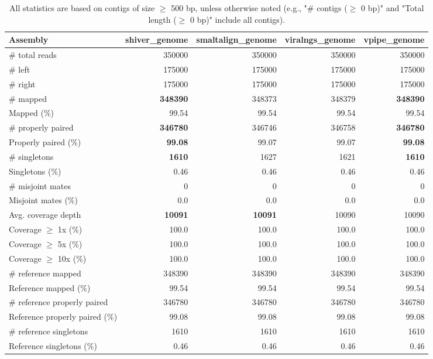 \documentclass[12pt,a4paper]{article}
\begin{document}
\begin{table}[ht]
\begin{center}
\caption{All statistics are based on contigs of size $\geq$ 500 bp, unless otherwise noted (e.g., "\# contigs ($\geq$ 0 bp)" and "Total length ($\geq$ 0 bp)" include all contigs).}
\begin{tabular}{|l*{4}{|r}|}
\hline
Assembly & shiver\_genome & smaltalign\_genome & viralngs\_genome & vpipe\_genome \\ \hline
\# total reads & 350000 & 350000 & 350000 & 350000 \\ \hline
\# left & 175000 & 175000 & 175000 & 175000 \\ \hline
\# right & 175000 & 175000 & 175000 & 175000 \\ \hline
\# mapped & {\bf 348390} & 348373 & 348379 & {\bf 348390} \\ \hline
Mapped (\%) & 99.54 & 99.54 & 99.54 & 99.54 \\ \hline
\# properly paired & {\bf 346780} & 346746 & 346758 & {\bf 346780} \\ \hline
Properly paired (\%) & {\bf 99.08} & 99.07 & 99.07 & {\bf 99.08} \\ \hline
\# singletons & {\bf 1610} & 1627 & 1621 & {\bf 1610} \\ \hline
Singletons (\%) & 0.46 & 0.46 & 0.46 & 0.46 \\ \hline
\# misjoint mates & 0 & 0 & 0 & 0 \\ \hline
Misjoint mates (\%) & 0.0 & 0.0 & 0.0 & 0.0 \\ \hline
Avg. coverage depth & {\bf 10091} & {\bf 10091} & 10090 & 10090 \\ \hline
Coverage $\geq$ 1x (\%) & 100.0 & 100.0 & 100.0 & 100.0 \\ \hline
Coverage $\geq$ 5x (\%) & 100.0 & 100.0 & 100.0 & 100.0 \\ \hline
Coverage $\geq$ 10x (\%) & 100.0 & 100.0 & 100.0 & 100.0 \\ \hline
\# reference mapped & 348390 & 348390 & 348390 & 348390 \\ \hline
Reference mapped (\%) & 99.54 & 99.54 & 99.54 & 99.54 \\ \hline
\# reference properly paired & 346780 & 346780 & 346780 & 346780 \\ \hline
Reference properly paired (\%) & 99.08 & 99.08 & 99.08 & 99.08 \\ \hline
\# reference singletons & 1610 & 1610 & 1610 & 1610 \\ \hline
Reference singletons (\%) & 0.46 & 0.46 & 0.46 & 0.46 \\ \hline

\end{tabular}
\end{center}
\end{table}
\end{document}
